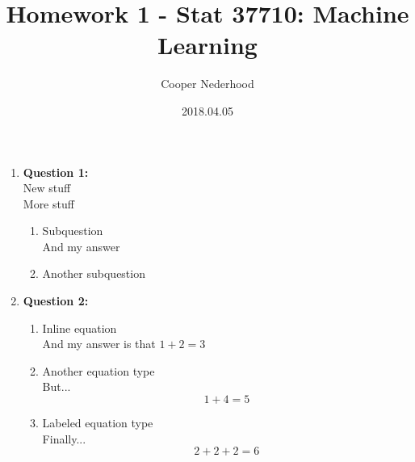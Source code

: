 \documentclass[a4paper, 12pt]{article}
\begin{document}
\title{Homework 1 - Stat 37710: Machine Learning}
\author{Cooper Nederhood}
\date{2018.04.05}
\maketitle

\begin{enumerate}
\item \textbf{Question 1:}
\\
New stuff
\\
More stuff

	\begin{enumerate}
	\item Subquestion
	\\
	And my answer

	\item Another subquestion
	\end{enumerate}



\item \textbf{Question 2:}

	\begin{enumerate}
	\item Inline equation
	\\
	And my answer is that $1+2 = 3$

	\item Another equation type
	\\
	But...
	$$1+4     = 5 $$
	
	\item Labeled equation type
	\\
	Finally...
	\begin{equation} 
		2 + 2 + 2 = 6
	\end{equation}
	
	\end{enumerate}




\end{enumerate}
\end{document}
